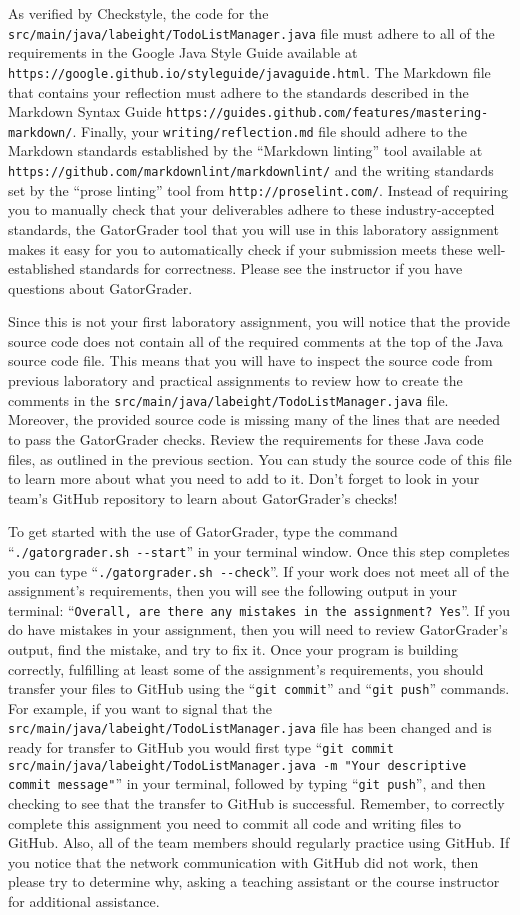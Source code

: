 \documentclass[11pt]{article}
\newcommand{\mainprogramsource}{\lstinline{src/main/java/labeight/TodoListManager.java}}
\newcommand{\reflection}{\lstinline{writing/reflection.md}}
\newcommand{\gatorgraderstart}{\command{./gatorgrader.sh --start}}
\newcommand{\gatorgradercheck}{\command{./gatorgrader.sh --check}}
\newcommand{\gitcommit}{\command{git commit}}
\newcommand{\gitpush}{\command{git push}}
\newcommand{\gitcommitmainprogram}{\command{git commit src/main/java/labeight/TodoListManager.java -m "Your
descriptive commit message"}}
\newcommand{\command}[1]{``\lstinline{#1}''}
\newcommand{\url}[1]{\lstinline{#1}}
\newcommand{\step}[1]{``{#1}''}
\begin{document}
As verified by Checkstyle, the code for the \mainprogramsource{} file must adhere to all of the requirements in the
Google Java Style Guide available at \url{https://google.github.io/styleguide/javaguide.html}. The Markdown file that
contains your reflection must adhere to the standards described in the Markdown Syntax Guide
\url{https://guides.github.com/features/mastering-markdown/}. Finally, your \reflection{} file should adhere to the
Markdown standards established by the \step{Markdown linting} tool available at
\url{https://github.com/markdownlint/markdownlint/} and the writing standards set by the \step{prose linting} tool from
\url{http://proselint.com/}. Instead of requiring you to manually check that your deliverables adhere to these
industry-accepted standards, the GatorGrader tool that you will use in this laboratory assignment makes it easy for you
to automatically check if your submission meets these well-established standards for correctness. Please see the
instructor if you have questions about GatorGrader.

Since this is not your first laboratory assignment, you will notice that the provide source code does not contain all of
the required comments at the top of the Java source code file. This means that you will have to inspect the source code
from previous laboratory and practical assignments to review how to create the comments in the \mainprogramsource{}
file. Moreover, the provided source code is missing many of the lines that are needed to pass the GatorGrader checks.
Review the requirements for these Java code files, as outlined in the previous section. You can study the source code of
this file to learn more about what you need to add to it. Don't forget to look in your team's GitHub repository to learn
about GatorGrader's checks!

To get started with the use of GatorGrader, type the command \gatorgraderstart{} in your terminal window. Once this step
completes you can type \gatorgradercheck{}. If your work does not meet all of the assignment's requirements, then you
will see the following output in your terminal: \command{Overall, are there any mistakes in the assignment? Yes}. If you
do have mistakes in your assignment, then you will need to review GatorGrader's output, find the mistake, and try to fix
it. Once your program is building correctly, fulfilling at least some of the assignment's requirements, you should
transfer your files to GitHub using the \gitcommit{} and \gitpush{} commands. For example, if you want to signal that
the \mainprogramsource{} file has been changed and is ready for transfer to GitHub you would first type
\gitcommitmainprogram{} in your terminal, followed by typing \gitpush{}, and then checking to see that the transfer to
GitHub is successful. Remember, to correctly complete this assignment you need to commit all code and writing files to
GitHub. Also, all of the team members should regularly practice using GitHub. If you notice that the network
communication with GitHub did not work, then please try to determine why, asking a teaching assistant or the course
instructor for additional assistance.
\end{document}
